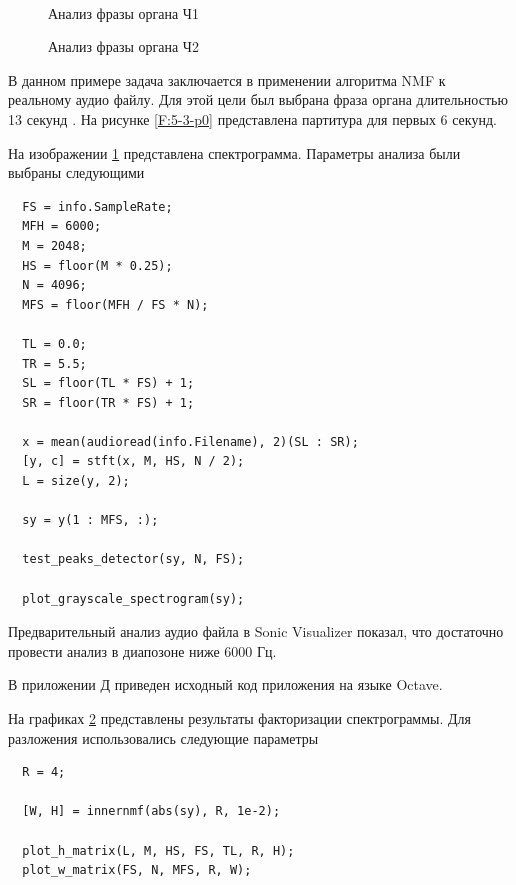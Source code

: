 \documentclass[oneside, final, 12pt]{extarticle}
\begin{document}
\begin{figure}
  \centering
  \qquad
  \\
  \centering
  \caption{Анализ фразы органа Ч1}
    \label{F:5-3-p1}
\end{figure}

\begin{figure}
  \centering
  \qquad
  \centering
  \caption{Анализ фразы органа Ч2}
    \label{F:5-3-p2}
\end{figure}

В данном примере задача заключается в применении алгоритма NMF
к реальному аудио файлу. Для этой цели был выбрана фраза органа длительностью
13 секунд \cite{L:organ.wav}. На рисунке \ref{F:5-3-p0} представлена
партитура для первых 6 секунд.

На изображении \ref{F:5-3-p1} представлена спектрограмма.
Параметры анализа были выбраны следующими
\begin{verbatim}
  FS = info.SampleRate;
  MFH = 6000;
  M = 2048;
  HS = floor(M * 0.25);
  N = 4096;
  MFS = floor(MFH / FS * N);

  TL = 0.0;
  TR = 5.5;
  SL = floor(TL * FS) + 1;
  SR = floor(TR * FS) + 1;

  x = mean(audioread(info.Filename), 2)(SL : SR);
  [y, c] = stft(x, M, HS, N / 2);
  L = size(y, 2);

  sy = y(1 : MFS, :);

  test_peaks_detector(sy, N, FS);

  plot_grayscale_spectrogram(sy);
\end{verbatim}

Предварительный анализ аудио файла в Sonic Visualizer \cite{L:sonic-visualizer}
показал, что достаточно провести анализ в диапозоне ниже 6000 Гц.

В приложении Д приведен исходный код приложения на языке Octave.

На графиках \ref{F:5-3-p2} представлены результаты факторизации спектрограммы.
Для разложения использовались следующие параметры
\begin{verbatim}
  R = 4;

  [W, H] = innernmf(abs(sy), R, 1e-2);

  plot_h_matrix(L, M, HS, FS, TL, R, H);
  plot_w_matrix(FS, N, MFS, R, W);
\end{verbatim}
\end{document}
